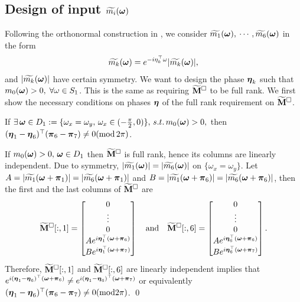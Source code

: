 \subsection{Design of input $\widetilde{m_{i}}(\boldsymbol{\omega})$}\label{sec: phase-design}
Following the orthonormal construction in \cite{yin2014orthshear}, we consider $\widetilde{m_{1}}(\boldsymbol{\omega}),$ $\cdots,\widetilde{m_{6}}(\boldsymbol{\omega})$ in the form 
\begin{align}\label{eq: m-form}
\widetilde{m_{k}}(\boldsymbol{\omega}) = e^{-i\eta_k^\top\omega}|\widetilde{m_{k}}(\boldsymbol{\omega})|,
\end{align}
 and $|\widetilde{m_{k}}(\boldsymbol{\omega})|$ have certain symmetry. We want to design the phase $\boldsymbol{\eta}_k$ such that $m_0(\boldsymbol{\omega}) > 0, \; \forall \omega\in S_1$. This is the same as requiring $\widetilde{\mathbf{M}}^{\Box}$ to be full rank.
 We first show the necessary conditions on phases $\boldsymbol{\eta}$ of the full rank requirement on $\widetilde{\mathbf{M}}^{\Box}$.
 
\begin{lemma}
If $\exists\,\boldsymbol{\omega}\in D_1:=\{\omega_x=\omega_y,\,\omega_x\in(-\frac{\pi}{2},0)\},\,s.t. \,m_0(\boldsymbol{\omega})>0,$ then $(\boldsymbol{\eta}_1-\boldsymbol{\eta}_6)^\top (\boldsymbol{\pi}_6-\boldsymbol{\pi}_7)\neq 0(\text{mod}\,2\pi)$. 
\end{lemma} 
  If $m_0(\boldsymbol{\omega})>0, \,\boldsymbol{\omega}\in D_1$ then $\widetilde{\mathbf{M}}^{\Box}$ is full rank, hence its columns are linearly independent. Due to symmetry, $|\widetilde{m_1}(\boldsymbol{\omega})| = |\widetilde{m_6}(\boldsymbol{\omega})|$ on $\{\omega_x=\omega_y\}$. Let $A = |\widetilde{m_1}(\boldsymbol{\omega}+\boldsymbol{\pi}_1)| = |\widetilde{m_6}(\boldsymbol{\omega}+\boldsymbol{\pi}_1)|$ and $B=|\widetilde{m_1}(\boldsymbol{\omega}+\boldsymbol{\pi}_6)| = |\widetilde{m_6}(\boldsymbol{\omega}+\boldsymbol{\pi}_6)|$, then the first and the last columns of $\widetilde{\mathbf{M}}^{\Box}$ are
  \begin{align*}
  \widetilde{\mathbf{M}}^{\Box}[:,1] = 
 \begin{bmatrix}
 0\\
 \vdots\\
 0\\
 Ae^{i\boldsymbol{\eta}_1^\top(\boldsymbol{\omega}+\boldsymbol{\pi}_6)}\\
 Be^{i\boldsymbol{\eta}_1^\top(\boldsymbol{\omega}+\boldsymbol{\pi}_7)}
 \end{bmatrix}
 \quad\text{and}\quad
  \widetilde{\mathbf{M}}^{\Box}[:,6] = 
 \begin{bmatrix}
 0\\
 \vdots\\
 0\\
 Ae^{i\boldsymbol{\eta}_6^\top(\boldsymbol{\omega}+\boldsymbol{\pi}_6)}\\
 Be^{i\boldsymbol{\eta}_6^\top(\boldsymbol{\omega}+\boldsymbol{\pi}_7)}
 \end{bmatrix} .
\end{align*}   
Therefore, $\widetilde{\mathbf{M}}^{\Box}[:,1]$ and $\widetilde{\mathbf{M}}^{\Box}[:,6]$ are linearly independent implies that $e^{i(\boldsymbol{\eta}_1-\boldsymbol{\eta}_6)^\top(\boldsymbol{\omega}+\boldsymbol{\pi}_6)}\neq e^{i(\boldsymbol{\eta}_1-\boldsymbol{\eta}_6)^\top(\boldsymbol{\omega}+\boldsymbol{\pi}_7)}$ or equivalently $(\boldsymbol{\eta}_1-\boldsymbol{\eta}_6)^\top(\boldsymbol{\pi}_6-\boldsymbol{\pi}_7)\neq 0(\text{mod}2\pi)$. \qed\\

